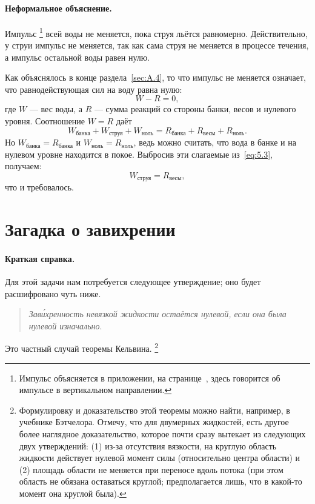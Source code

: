 \paragraph{Неформальное объяснение.}
Импульс%
\footnote{Импульс объясняется в приложении, на странице~\pageref{Импульс}, здесь говорится об импульсе в вертикальном направлении.}
всей воды не меняется, пока струя льётся равномерно.
Действительно, у струи импульс не меняется, так как сама струя не меняется в процессе течения, а импульс остальной воды равен нулю.

Как объяснялось в конце раздела~\ref{sec:A.4},
то что импульс не меняется означает, что равнодействующая сил на воду равна нулю:
\[W-R=0,\]
где $W$ --- вес воды, а $R$ --- сумма реакций со стороны банки, весов и нулевого уровня.
Соотношение $W=R$ даёт
\begin{equation}
W_{\text{банка}} + W_{\text{струя}} + W_{\text{ноль}}
= R_{\text{банка}} + R_{\text{весы}} + R_{\text{ноль}}.
\label{eq:5.3}
\end{equation}
Но $W_{\text{банка}}=R_{\text{банка}}$ и $W_{\text{ноль}}=R_{\text{ноль}}$, ведь можно считать, что вода в банке и на нулевом уровне находится в покое.
Выбросив эти слагаемые из~\eqref{eq:5.3}, получаем:
\[
W_{\text{струя}}=R_{\text{весы}},
\]
что и требовалось.

\section{Загадка о завихрении}

\paragraph{Краткая справка.}
Для этой задачи нам потребуется следующее утверждение;
оно будет расшифровано чуть ниже.
\begin{quote}
\emph{Зав\'{и}хренность невязкой жидкости остаётся нулевой, если она была нулевой изначально}.
\end{quote}
Это частный случай теоремы Кельвина.%
\footnote{Формулировку и доказательство этой теоремы можно найти, например, в учебнике Бэтчелора.
Отмечу, что для двумерных жидкостей, есть другое более наглядное доказательство, которое почти сразу вытекает из следующих двух утверждений: (1) из-за отсутствия вязкости, на круглую область жидкости действует нулевой момент силы (относительно центра области) и (2) площадь области не меняется при переносе вдоль потока (при этом область не обязана оставаться круглой; предполагается лишь, что в какой-то момент она круглой была).}

